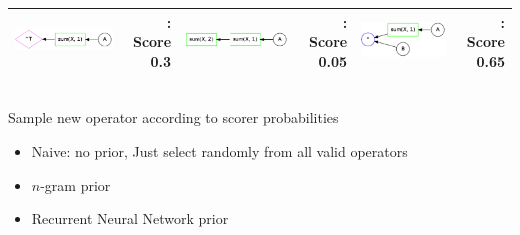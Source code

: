 \documentclass[landscape,a0b]{a0poster_csml_v2}
\begin{document}
\begin{poster}
\begin{PosterColumn}
\begin{minipage}[hc]{\textwidth}
  \centering
  \begin{center}
      \begin{tabular}{|CD|CD|CD|}
        \hline
        \includegraphics[width=\linewidth]{imgs/prior1.png} & : Score 0.3 &
        \includegraphics[width=\linewidth]{imgs/prior2.png} & : Score 0.05 &
        \includegraphics[width=\linewidth]{imgs/prior3.png} & : Score 0.65 \\
        \hline
      \end{tabular}
  \end{center}
\end{minipage}
\vspace{0.1cm}
\\
Sample new operator according to scorer probabilities
\vspace{-0.1cm}

\vspace{-1cm}
\begin{itemize}
  \item Naive: no prior, Just select randomly from all valid operators
  \item $n$-gram prior
  \item Recurrent Neural Network prior
\end{itemize}


\end{PosterColumn}
\end{poster}
\end{document}
